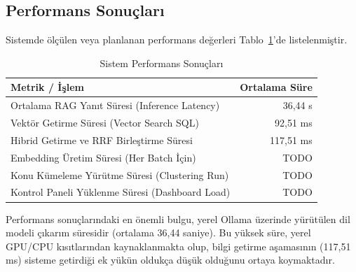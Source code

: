 \subsection{Performans Sonuçları}
Sistemde ölçülen veya planlanan performans değerleri Tablo~\ref{tab:performans_degerleri}'de listelenmiştir.

\begin{table}[H]
\centering
\caption{Sistem Performans Sonuçları}
\label{tab:performans_degerleri}
\begin{tabular}{lr}
\hline
Metrik / İşlem & Ortalama Süre \\
\hline
Ortalama RAG Yanıt Süresi (Inference Latency) & 36,44 s \\
Vektör Getirme Süresi (Vector Search SQL) & 92,51 ms \\
Hibrid Getirme ve RRF Birleştirme Süresi & 117,51 ms \\
Embedding Üretim Süresi (Her Batch İçin) & TODO \\
Konu Kümeleme Yürütme Süresi (Clustering Run) & TODO \\
Kontrol Paneli Yüklenme Süresi (Dashboard Load) & TODO \\
\hline
\end{tabular}
\end{table}

Performans sonuçlarındaki en önemli bulgu, yerel Ollama üzerinde yürütülen dil modeli çıkarım süresidir (ortalama 36,44 saniye). Bu yüksek süre, yerel GPU/CPU kısıtlarından kaynaklanmakta olup, bilgi getirme aşamasının (117,51 ms) sisteme getirdiği ek yükün oldukça düşük olduğunu ortaya koymaktadır.

